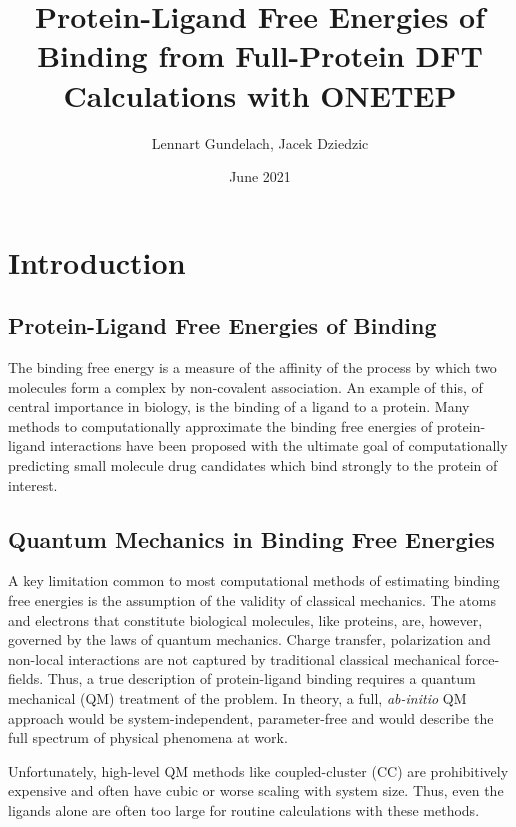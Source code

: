 \documentclass{article}
\title{Protein-Ligand Free Energies of Binding from Full-Protein DFT Calculations with ONETEP}
\author{Lennart Gundelach, Jacek Dziedzic}
\date{June 2021}
\begin{document}
\pagestyle{fancy}
\fancyhf{}
\maketitle

\thispagestyle{empty}
\clearpage
{} 


\section{Introduction}
\subsection{Protein-Ligand Free Energies of Binding}
The binding free energy is a measure of the affinity of the process by which two molecules form a complex by non-covalent association. An example of this, of central importance in biology, is the binding of a ligand to a protein. Many methods to computationally approximate the binding free energies of protein-ligand interactions have been proposed with the ultimate goal of computationally predicting small molecule drug candidates which bind strongly to the protein of interest. 

\subsection{Quantum Mechanics in Binding Free Energies}
A key limitation common to most computational methods of estimating binding free energies is the assumption of the validity of classical mechanics. The atoms and electrons that constitute biological molecules, like proteins, are, however, governed by the laws of quantum mechanics. Charge transfer, polarization and non-local interactions are not captured by traditional classical mechanical force-fields. Thus, a true description of protein-ligand binding requires a quantum mechanical (QM) treatment of the problem. In theory, a full, \textit{ab-initio} QM approach would be system-independent, parameter-free and would describe the full spectrum of physical phenomena at work. 

Unfortunately, high-level QM methods like coupled-cluster (CC) are prohibitively expensive and often have cubic or worse scaling with system size. Thus, even the ligands alone are often too large for routine calculations with these methods. 
\end{document}
